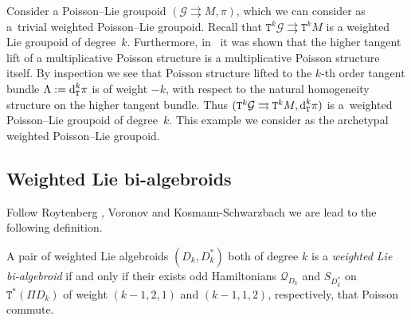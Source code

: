 \documentclass[10pt,a4paper]{amsart}
\newcommand{\rmd}{\textnormal{d}}
\def\sT{{\mathtt T}}
\numberwithin{equation}{section}
\begin{document}
\begin{Example}
Consider a Poisson--Lie groupoid $(\mathcal{G} \rightrightarrows M, \pi)$, which we can consider as a~trivial weighted Poisson--Lie groupoid. Recall that $\sT^{k}\mathcal{G} \rightrightarrows \sT^{k}M$ is a weighted Lie groupoid of degree~$k$. Furthermore, in~\cite{KouotchopWamba:2013} it was shown that the higher tangent lift of a multiplicative Poisson structure is  a multiplicative Poisson structure itself. By inspection we see that Poisson structure lifted to the $k$-th order tangent bundle $ \Lambda := \rmd_{\sT}^{k}\pi$ is of weight $-k$, with respect to the natural homogeneity structure on the higher tangent bundle. Thus $(\sT^{k}\mathcal{G} \rightrightarrows \sT^{k}M, \rmd_{\sT}^{k}\pi )$ is a~weighted Poisson--Lie groupoid of degree~$k$. This example we consider  as the archetypal weighted Poisson--Lie groupoid.
\end{Example}


\subsection{Weighted Lie bi-algebroids}

Follow Roytenberg \cite{Roytenberg:2001}, Voronov \cite{Voronov:2001qf} and Kosmann-Schwarzbach  \cite{Kosmann-Schwarzbach:1995}  we are lead to the following def\/inition.

\begin{Definition}
A pair of weighted Lie algebroids $(D_{k}, D_{k}^{*})$  both of degree $k$  is a \emph{weighted Lie bi-algebroid} if and only if their exists odd Hamiltonians $\mathcal{Q}_{D_{k}}$ and $S_{D_{k}^{*}}$  on $\sT^{*}(\Pi D_{k})$ of weight $(k-1, 2,1)$ and $(k-1, 1,2)$, respectively,  that Poisson commute.
\end{Definition}
\end{document}
